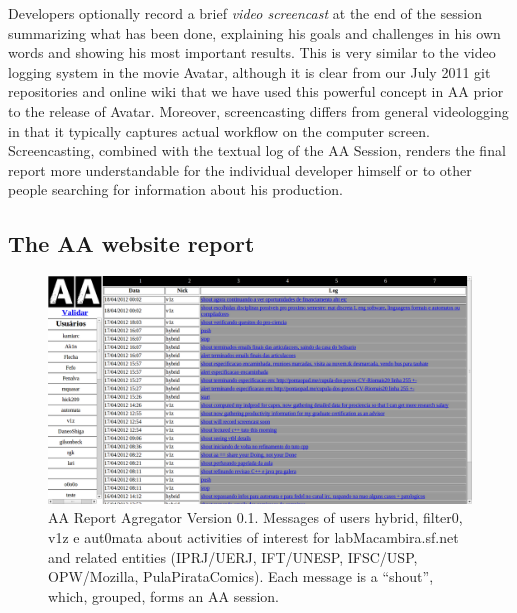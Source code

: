 \documentclass{article}
\begin{document}
Developers optionally record a brief \emph{video screencast} at the end of the
session summarizing what has been done, explaining his goals and challenges
in his own words and showing his most important results. This is very similar to
the video logging system in the movie Avatar, although it is clear from our
July 2011 git repositories and online wiki that we have used this powerful
concept in AA prior to the release of Avatar. Moreover, screencasting differs
from general videologging in that it typically captures actual workflow on the
computer screen. Screencasting, combined with the textual log of the AA Session,
renders the final report more understandable for the individual developer
himself or to other people searching for information about his production.

\subsection{The AA website report}

\begin{figure}
\begin{center}
   \includegraphics[width=0.95\linewidth]{figs/aa-0_1.png}
\end{center}
   \caption{AA Report Agregator Version 0.1. Messages of users hybrid, filter0,
   v1z e aut0mata about activities of interest for labMacambira.sf.net and
   related entities (IPRJ/UERJ, IFT/UNESP, IFSC/USP, OPW/Mozilla,
   PulaPirataComics). Each message is a ``shout'', which, grouped, forms an AA
   session.}
\label{fig:aaserver}
\end{figure}
\end{document}
